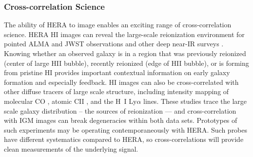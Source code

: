 \documentclass[preprint]{aastex}
\newcommand{\compress}{\vspace{-0.3in}}
\begin{document}


\compress
\subsubsection{Cross-correlation Science}
\label{sec:CrossCorrelation}

The ability of HERA to image enables an exciting range of cross-correlation science.
HERA HI images can reveal the large-scale reionization environment for pointed ALMA and JWST
observations and other deep near-IR surveys \citep{lidz_et_al2009}.
Knowing whether an observed galaxy is in a region that  was
previously reionized (center of large HII bubble), recently reionized (edge of HII bubble), or is forming from
pristine HI provides important contextual information on early galaxy formation and especially feedback.
HI images can also be cross-correlated with other diffuse
tracers of large scale structure, including intensity
mapping of molecular  CO \cite{lidz_et_al2011}, atomic CII \citep{gong_et_al2011}, and the H~I Ly$\alpha$ \citep{silva_et_al2013} lines. These studies
trace the large scale galaxy distribution -- the sources of reionization — and cross-correlation 
with IGM images can break degeneracies within both data sets. Prototypes of such experiments
may be operating contemporaneously with HERA. Such probes have different systematics
compared to HERA, so cross-correlations will provide clean measurements of the underlying signal.

\end{document}
